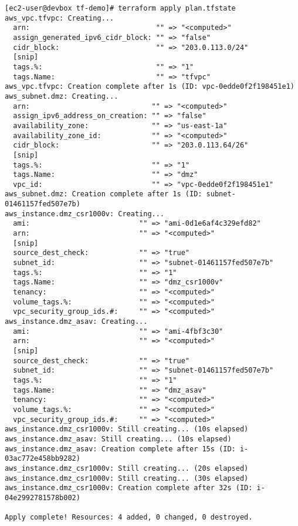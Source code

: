 \begin{verbatim}
[ec2-user@devbox tf-demo]# terraform apply plan.tfstate
aws_vpc.tfvpc: Creating...
  arn:                              "" => "<computed>"
  assign_generated_ipv6_cidr_block: "" => "false"
  cidr_block:                       "" => "203.0.113.0/24"
  [snip]
  tags.%:                           "" => "1"
  tags.Name:                        "" => "tfvpc"
aws_vpc.tfvpc: Creation complete after 1s (ID: vpc-0edde0f2f198451e1)
aws_subnet.dmz: Creating...
  arn:                             "" => "<computed>"
  assign_ipv6_address_on_creation: "" => "false"
  availability_zone:               "" => "us-east-1a"
  availability_zone_id:            "" => "<computed>"
  cidr_block:                      "" => "203.0.113.64/26"
  [snip]
  tags.%:                          "" => "1"
  tags.Name:                       "" => "dmz"
  vpc_id:                          "" => "vpc-0edde0f2f198451e1"
aws_subnet.dmz: Creation complete after 1s (ID: subnet-01461157fed507e7b)
aws_instance.dmz_csr1000v: Creating...
  ami:                          "" => "ami-0d1e6af4c329efd82"
  arn:                          "" => "<computed>"
  [snip]
  source_dest_check:            "" => "true"
  subnet_id:                    "" => "subnet-01461157fed507e7b"
  tags.%:                       "" => "1"
  tags.Name:                    "" => "dmz_csr1000v"
  tenancy:                      "" => "<computed>"
  volume_tags.%:                "" => "<computed>"
  vpc_security_group_ids.#:     "" => "<computed>"
aws_instance.dmz_asav: Creating...
  ami:                          "" => "ami-4fbf3c30"
  arn:                          "" => "<computed>"
  [snip]
  source_dest_check:            "" => "true"
  subnet_id:                    "" => "subnet-01461157fed507e7b"
  tags.%:                       "" => "1"
  tags.Name:                    "" => "dmz_asav"
  tenancy:                      "" => "<computed>"
  volume_tags.%:                "" => "<computed>"
  vpc_security_group_ids.#:     "" => "<computed>"
aws_instance.dmz_csr1000v: Still creating... (10s elapsed)
aws_instance.dmz_asav: Still creating... (10s elapsed)
aws_instance.dmz_asav: Creation complete after 15s (ID: i-03ac772e458bb9282)
aws_instance.dmz_csr1000v: Still creating... (20s elapsed)
aws_instance.dmz_csr1000v: Still creating... (30s elapsed)
aws_instance.dmz_csr1000v: Creation complete after 32s (ID: i-04e2992781578b002)

Apply complete! Resources: 4 added, 0 changed, 0 destroyed.
\end{verbatim}

